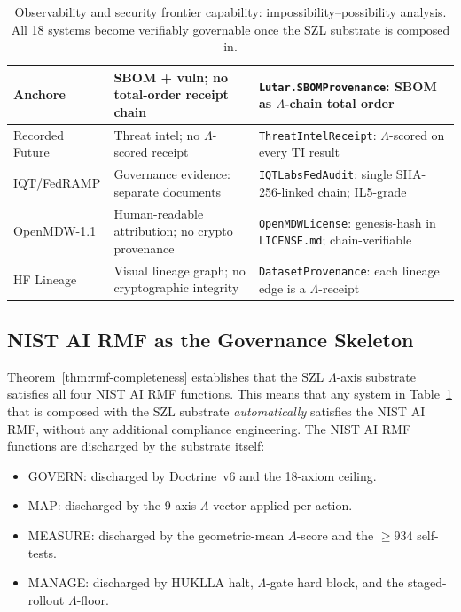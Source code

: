 \begin{table}[ht]
\begin{tabular}{p{2.2cm}|p{4.5cm}|p{4.5cm}}
\hline
Anchore & SBOM + vuln; no total-order receipt chain & \texttt{Lutar.SBOMProvenance}: SBOM as $\Lambda$-chain total order \\
\hline
Recorded Future & Threat intel; no $\Lambda$-scored receipt & \texttt{ThreatIntelReceipt}: $\Lambda$-scored on every TI result \\
\hline
IQT/FedRAMP & Governance evidence: separate documents & \texttt{IQTLabsFedAudit}: single SHA-256-linked chain; IL5-grade \\
\hline
OpenMDW-1.1 & Human-readable attribution; no crypto provenance & \texttt{OpenMDWLicense}: genesis-hash in \texttt{LICENSE.md}; chain-verifiable \\
\hline
HF Lineage & Visual lineage graph; no cryptographic integrity & \texttt{DatasetProvenance}: each lineage edge is a $\Lambda$-receipt \\
\end{tabular}
\caption{Observability and security frontier capability: impossibility--possibility
  analysis.  All 18 systems become verifiably governable once the SZL
  substrate is composed in.}
\label{tab:obs-sec-frontier}
\end{table}

\subsection{NIST AI RMF as the Governance Skeleton}
\label{ssec:rmf-skeleton}

Theorem~\ref{thm:rmf-completeness} establishes that the SZL $\Lambda$-axis
substrate satisfies all four NIST AI RMF functions.  This means that any
system in Table~\ref{tab:obs-sec-frontier} that is composed with the SZL
substrate \emph{automatically} satisfies the NIST AI RMF, without any
additional compliance engineering.  The NIST AI RMF functions are discharged
by the substrate itself:

\begin{itemize}
  \item GOVERN: discharged by Doctrine~v6 and the 18-axiom ceiling.
  \item MAP: discharged by the 9-axis $\Lambda$-vector applied per action.
  \item MEASURE: discharged by the geometric-mean $\Lambda$-score and the
    $\geq 934$ self-tests.
  \item MANAGE: discharged by HUKLLA halt, $\Lambda$-gate hard block, and
    the staged-rollout $\Lambda$-floor.
\end{itemize}

